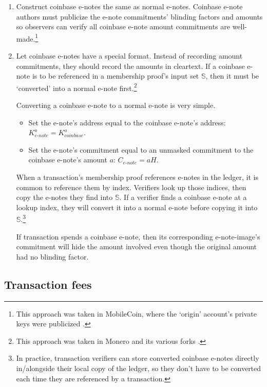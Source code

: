 \begin{enumerate}
    \item Construct coinbase e-notes the same as normal e-notes. Coinbase e-note authors must publicize the e-note commitments' blinding factors and amounts so observers can verify all coinbase e-note amount commitments are well-made.\footnote{This approach was taken in MobileCoin, where the `origin' account's private keys were publicized \cite{mobilecoin-governance-fees-supply}.}

    \item Let coinbase e-notes have a special format. Instead of recording amount commitments, they should record the amounts in cleartext. If a coinbase e-note is to be referenced in a membership proof's input set $\mathbb{S}$, then it must be `converted' into a normal e-note first.\footnote{This approach was taken in Monero and its various forks \cite{ztm-2}.}

    Converting a coinbase e-note to a normal e-note is very simple.
    \begin{itemize}
        \item Set the e-note's address equal to the coinbase e-note's address: $K^o_{e\textrm{-}note} = K^o_{coinbase}$.
        \item Set the e-note's commitment equal to an unmasked commitment to the coinbase e-note's amount $a$: $C_{e\textrm{-}note} = a H$.
    \end{itemize}

    When a transaction's membership proof references e-notes in the ledger, it is common to reference them by index. Verifiers look up those indices, then copy the e-notes they find into $\mathbb{S}$. If a verifier finds a coinbase e-note at a lookup index, they will convert it into a normal e-note before copying it into $\mathbb{S}$.\footnote{In practice, transaction verifiers can store converted coinbase e-notes directly in/alongside their local copy of the ledger, so they don't have to be converted each time they are referenced by a transaction.}

    If transaction spends a coinbase e-note, then its corresponding e-note-image's commitment will hide the amount involved even though the original amount had no blinding factor.
\end{enumerate}


\subsection{Transaction fees}
\label{subsec:implementers-transaction-fees}

